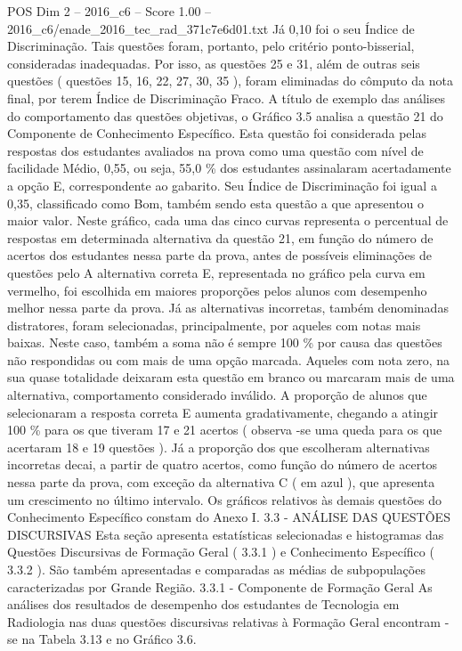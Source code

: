 \begin{textsample}{POS Dim 2 – 2016\_c6 – Score 1.00 – 2016\_c6/enade\_2016\_tec\_rad\_371c7e6d01.txt}
Já 0,10 foi o seu Índice de Discriminação.
Tais questões foram, portanto, pelo critério ponto-bisserial, consideradas inadequadas.
Por isso, as questões 25 e 31, além de outras seis questões ( questões 15, 16, 22, 27, 30, 35 ), foram eliminadas do cômputo da nota final, por terem Índice de Discriminação Fraco.
A título de exemplo das análises do comportamento das questões objetivas, o Gráfico 3.5 analisa a questão 21 do Componente de Conhecimento Específico.
Esta questão foi considerada pelas respostas dos estudantes avaliados na prova como uma questão com nível de facilidade Médio, 0,55, ou seja, 55,0 \% dos estudantes assinalaram acertadamente a opção E, correspondente ao gabarito.
Seu Índice de Discriminação foi igual a 0,35, classificado como Bom, também sendo esta questão a que apresentou o maior valor.
Neste gráfico, cada uma das cinco curvas representa o percentual de respostas em determinada alternativa da questão 21, em função do número de acertos dos estudantes nessa parte da prova, antes de possíveis eliminações de questões pelo A alternativa correta E, representada no gráfico pela curva em vermelho, foi escolhida em maiores proporções pelos alunos com desempenho melhor nessa parte da prova.
Já as alternativas incorretas, também denominadas distratores, foram selecionadas, principalmente, por aqueles com notas mais baixas.
Neste caso, também a soma não é sempre 100 \% por causa das questões não respondidas ou com mais de uma opção marcada.
Aqueles com nota zero, na sua quase totalidade deixaram esta questão em branco ou marcaram mais de uma alternativa, comportamento considerado inválido.
A proporção de alunos que selecionaram a resposta correta E aumenta gradativamente, chegando a atingir 100 \% para os que tiveram 17 e 21 acertos ( observa -se uma queda para os que acertaram 18 e 19 questões ).
Já a proporção dos que escolheram alternativas incorretas decai, a partir de quatro acertos, como função do número de acertos nessa parte da prova, com exceção da alternativa C ( em azul ), que apresenta um crescimento no último intervalo.
Os gráficos relativos às demais questões do Conhecimento Específico constam do Anexo I. 3.3 - ANÁLISE DAS QUESTÕES DISCURSIVAS Esta seção apresenta estatísticas selecionadas e histogramas das Questões Discursivas de Formação Geral ( 3.3.1 ) e Conhecimento Específico ( 3.3.2 ).
São também apresentadas e comparadas as médias de subpopulações caracterizadas por Grande Região. 3.3.1 - Componente de Formação Geral As análises dos resultados de desempenho dos estudantes de Tecnologia em Radiologia nas duas questões discursivas relativas à Formação Geral encontram -se na Tabela 3.13 e no Gráfico 3.6.

\end{textsample}

